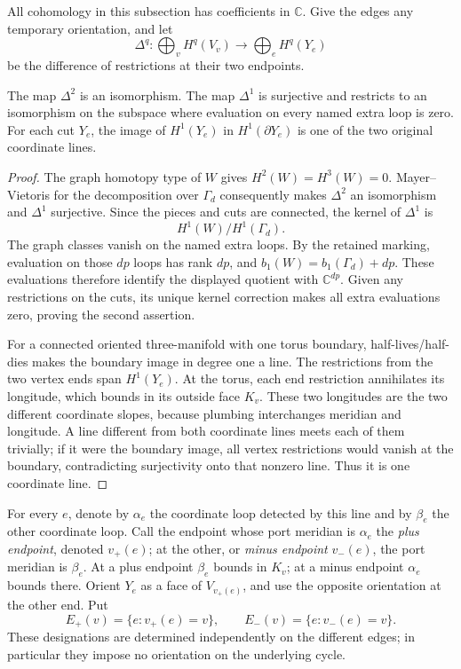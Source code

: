 All cohomology in this subsection has coefficients in $\mathbb C$.
Give the edges any temporary orientation, and let
\[
 \Delta^q:\bigoplus_v H^q(V_v)\longrightarrow\bigoplus_e H^q(Y_e)
\]
be the difference of restrictions at their two endpoints.

\begin{lemma}
\label{for:linear}
The map $\Delta^2$ is an isomorphism.  The map $\Delta^1$ is
surjective and restricts to an isomorphism on the subspace where
evaluation on every named extra loop is zero.  For each cut $Y_e$, the
image of $H^1(Y_e)$ in $H^1(\partial Y_e)$ is one of the two original
coordinate lines.
\end{lemma}

\begin{proof}
The graph homotopy type of $W$ gives $H^2(W)=H^3(W)=0$.
Mayer--Vietoris for the decomposition over $\Gamma_d$ consequently
makes $\Delta^2$ an isomorphism and $\Delta^1$ surjective.  Since the
pieces and cuts are connected, the kernel of $\Delta^1$ is
\[
 H^1(W)\big/H^1(\Gamma_d).
\]
The graph classes vanish on the named extra loops.  By the retained
marking, evaluation on those $dp$ loops has rank $dp$, and
$b_1(W)=b_1(\Gamma_d)+dp$.  These evaluations therefore identify the
displayed quotient with $\mathbb C^{dp}$.  Given any restrictions on
the cuts, its unique kernel correction makes all extra evaluations
zero, proving the second assertion.

For a connected oriented three-manifold with one torus boundary,
half-lives/half-dies makes the boundary image in degree one a line.
The restrictions from the two vertex ends span $H^1(Y_e)$.  At the
torus, each end restriction annihilates its longitude, which bounds
in its outside face $K_v$.  These two longitudes are the two different
coordinate slopes, because plumbing interchanges meridian and
longitude.  A line different from both coordinate lines meets each
of them trivially; if it were the boundary image, all vertex
restrictions would vanish at the boundary, contradicting surjectivity
onto that nonzero line.  Thus it is one coordinate line.
\end{proof}

For every $e$, denote by $\alpha_e$ the coordinate loop detected by
this line and by $\beta_e$ the other coordinate loop.  Call the endpoint
whose port meridian is $\alpha_e$ the \emph{plus endpoint}, denoted
$v_+(e)$; at the other, or \emph{minus endpoint} $v_-(e)$, the port
meridian is $\beta_e$.  At a plus endpoint $\beta_e$ bounds in $K_v$;
at a minus endpoint $\alpha_e$ bounds there.  Orient $Y_e$ as a face of
$V_{v_+(e)}$, and use the opposite orientation at the other end.  Put
\[
 E_+(v)=\{e:v_+(e)=v\},\qquad E_-(v)=\{e:v_-(e)=v\}.
\]
These designations are determined independently on the different
edges; in particular they impose no orientation on the underlying
cycle.

